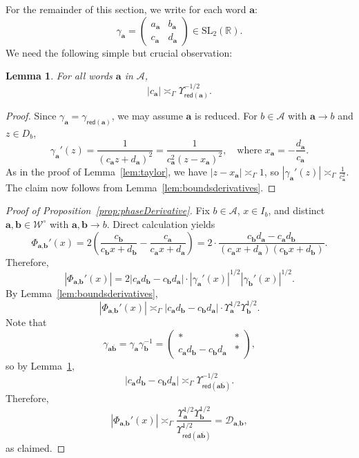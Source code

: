 \documentclass[12pt,letterpaper]{amsart}
\theoremstyle{plain}
\newtheorem{lemma}[prop]{Lemma}
\theoremstyle{definition}
\theoremstyle{remark}
\newcommand{\Aa}{\textbf{a}}
\newcommand{\Bb}{\textbf{b}}
\newcommand{\R}{\mathbb{R}}
\newcommand{\pmat}[4]{\begin{pmatrix} #1&#2\\#3&#4\end{pmatrix}}
\begin{document}
For the remainder of this section, we write for each word $\Aa$:
$$
\gamma_{\Aa} = \pmat{a_{\Aa}}{b_{\Aa}}{c_{\Aa}}{d_{\Aa}}\in \mathrm{SL}_2(\R).
$$
We need the following simple but crucial observation:

\begin{lemma}\label{lem:matrixEntriesBound}
For all words $\Aa$ in $\mathcal{A}$,
\[
|c_{\Aa}| \asymp_\Gamma \Upsilon_{\mathsf{red}(\Aa)}^{-1/2}.
\]
\end{lemma}

\begin{proof}
Since $\gamma_{\Aa} = \gamma_{\mathsf{red}(\Aa)}$, we may assume $\Aa$ is reduced. For $b \in \mathcal{A}$ with $\Aa \to b$ and $z \in D_b$,
\[
\gamma_{\Aa}'(z) = \frac{1}{(c_{\Aa} z + d_{\Aa})^2}
= \frac{1}{c_{\Aa}^2 (z - x_{\Aa})^2}, \quad \text{where } x_{\Aa} = -\frac{d_{\Aa}}{c_{\Aa}}.
\]
As in the proof of Lemma~\ref{lem:taylor}, we have $|z - x_{\Aa}| \asymp_\Gamma 1$, so $|\gamma_{\Aa}'(z)| \asymp_\Gamma \frac{1}{c_{\Aa}^2}$. The claim now follows from Lemma~\ref{lem:boundsderivatives}.
\end{proof}

\begin{proof}[Proof of Proposition~\ref{prop:phaseDerivative}]
Fix $b \in \mathcal{A}$, $x \in I_b$, and distinct $\Aa, \Bb \in \mathcal{W}^\circ$ with $\Aa, \Bb \to b$. Direct calculation yields
\begin{equation}\label{firstDer}
\Phi_{\Aa, \Bb}'(x) = 2\left( \frac{c_{\Bb}}{c_{\Bb} x + d_{\Bb}} - \frac{c_{\Aa}}{c_{\Aa} x + d_{\Aa}}  \right)
= 2 \cdot \frac{c_{\Bb} d_{\Aa} - c_{\Aa} d_{\Bb}}{(c_{\Aa} x + d_{\Aa})(c_{\Bb} x + d_{\Bb})}.
\end{equation}
Therefore,
\[
|\Phi_{\Aa, \Bb}'(x)| = 2 |c_{\Aa} d_{\Bb} - c_{\Bb} d_{\Aa}| \cdot |\gamma_{\Aa}'(x)|^{1/2} |\gamma_{\Bb}'(x)|^{1/2}.
\]
By Lemma~\ref{lem:boundsderivatives},
\[
|\Phi_{\Aa, \Bb}'(x)| \asymp_\Gamma |c_{\Aa} d_{\Bb} - c_{\Bb} d_{\Aa}| \cdot \Upsilon_{\Aa}^{1/2} \Upsilon_{\Bb}^{1/2}.
\]
Note that
\[
\gamma_{\Aa \overline{\Bb}} = \gamma_{\Aa} \gamma_{\Bb}^{-1} =
\begin{pmatrix}
\ast & \ast \\
c_{\Aa} d_{\Bb} - c_{\Bb} d_{\Aa} & \ast
\end{pmatrix},
\]
so by Lemma~\ref{lem:matrixEntriesBound},
\[
|c_{\Aa} d_{\Bb} - c_{\Bb} d_{\Aa}| \asymp_\Gamma \Upsilon_{\mathsf{red}(\Aa \overline{\Bb})}^{-1/2}.
\]
Therefore,
\[
|\Phi_{\Aa, \Bb}'(x)| \asymp_\Gamma \frac{\Upsilon_{\Aa}^{1/2} \Upsilon_{\Bb}^{1/2}}{\Upsilon_{\mathsf{red}(\Aa \overline{\Bb})}^{1/2}} = \mathcal{D}_{\Aa, \Bb},
\]
as claimed.
\end{proof}
\end{document}
